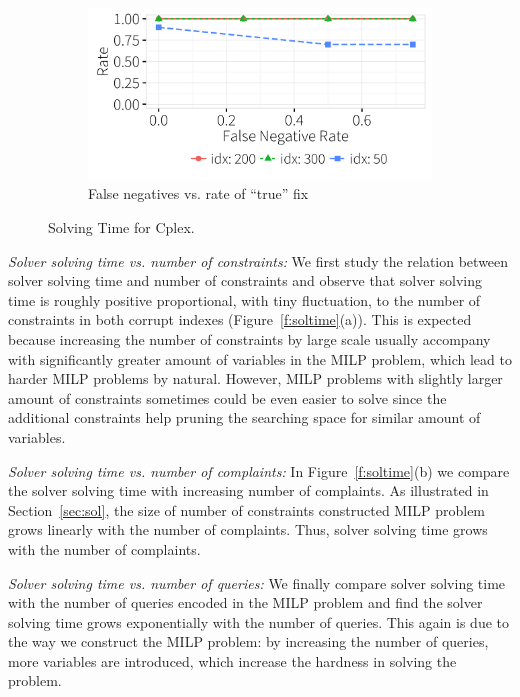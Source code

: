 \begin{figure}[ht]
    \begin{subfigure} [t]{.3\textwidth}
    \includegraphics[width = .99\columnwidth]{figures/noise_fn_acc_idx}
    \vspace*{-.25in}
    \caption{False negatives vs. rate of ``true'' fix}
    \vspace*{-.1in}
    \label{f:heuristic_time} 
    \end{subfigure}
   \caption{Solving Time for Cplex. }
   \vspace*{-.1in}
  \end{figure}


\emph{Solver solving time vs. number of constraints: } We first study the relation between solver solving time and number of constraints and observe that solver solving time is roughly positive proportional, with tiny fluctuation, to the number of constraints in both corrupt indexes (Figure~\ref{f:soltime}(a)). This is expected because increasing the number of constraints by large scale usually accompany with significantly greater amount of variables in the MILP problem, which lead to harder MILP problems by natural. However, MILP problems with slightly larger amount of constraints sometimes could be even easier to solve since the additional constraints help pruning the searching space for similar amount of variables.

\smallskip
\emph{Solver solving time vs. number of complaints: } In Figure~\ref{f:soltime}(b) we compare the solver solving 
time with increasing number of complaints. As illustrated in Section~\ref{sec:sol}, 
the size of number of constraints constructed MILP problem grows linearly with the number of complaints. Thus, solver solving time grows with the number of complaints. 


\smallskip
\emph{Solver solving time vs. number of queries: } We finally compare solver solving time with the number of queries encoded in the MILP problem and find the solver solving time grows exponentially with the number of queries. This again is due to the way we construct the MILP problem: by increasing the number of queries, more variables are introduced, which increase the hardness in solving the problem. 

